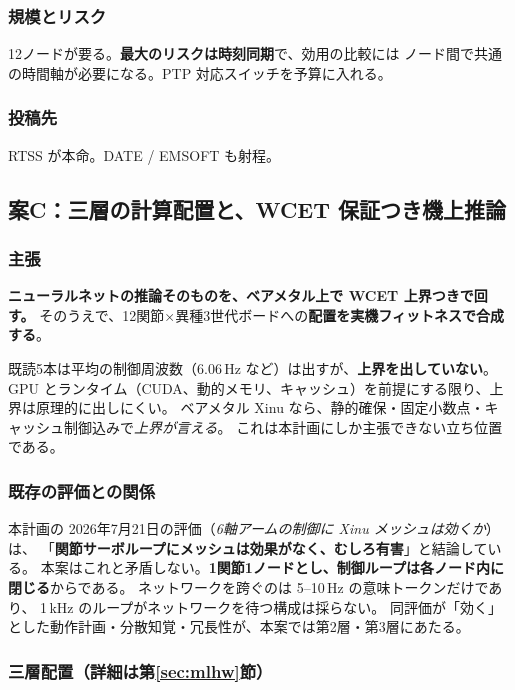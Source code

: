 \documentclass[11pt,a4paper]{article}
\newcommand{\prob}[1]{\textbf{\textcolor{red!55!black}{#1}}}
\newcommand{\keyp}[1]{\textbf{\textcolor{blue!45!black}{#1}}}
\begin{document}
\subsubsection*{規模とリスク}

12ノードが要る。\prob{最大のリスクは時刻同期}で、効用の比較には
ノード間で共通の時間軸が必要になる。PTP 対応スイッチを予算に入れる。

\subsubsection*{投稿先}

RTSS が本命。DATE / EMSOFT も射程。

\subsection{案C：三層の計算配置と、WCET 保証つき機上推論}

\subsubsection*{主張}

\keyp{ニューラルネットの推論そのものを、ベアメタル上で WCET 上界つきで回す。}
そのうえで、12関節×異種3世代ボードへの\keyp{配置を実機フィットネスで合成する}。

既読5本は平均の制御周波数（6.06\,Hz など）は出すが、\prob{上界を出していない}。
GPU とランタイム（CUDA、動的メモリ、キャッシュ）を前提にする限り、上界は原理的に出しにくい。
ベアメタル Xinu なら、静的確保・固定小数点・キャッシュ制御込みで\emph{上界が言える}。
これは本計画にしか主張できない立ち位置である。

\subsubsection*{既存の評価との関係}

本計画の 2026年7月21日の評価（\emph{6軸アームの制御に Xinu メッシュは効くか}）は、
「\prob{関節サーボループにメッシュは効果がなく、むしろ有害}」と結論している。
本案はこれと矛盾しない。\keyp{1関節1ノードとし、制御ループは各ノード内に閉じる}からである。
ネットワークを跨ぐのは 5--10\,Hz の意味トークンだけであり、
1\,kHz のループがネットワークを待つ構成は採らない。
同評価が「効く」とした動作計画・分散知覚・冗長性が、本案では第2層・第3層にあたる。

\subsubsection*{三層配置（詳細は第\ref{sec:mlhw}節）}
\end{document}
